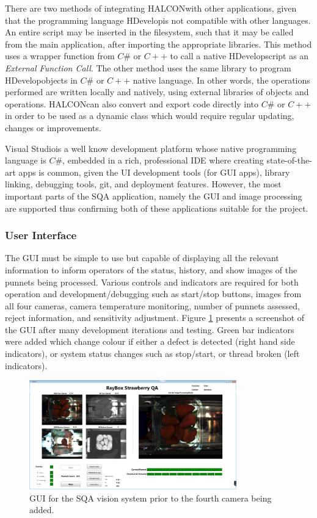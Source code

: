 \documentclass[fleqn,twoside,12pt]{report}
\begin{document}
There are two methods of integrating HALCON\texttrademark with other applications, given that the programming language HDevelop\texttrademark is not compatible with other languages. An entire script may be inserted in the filesystem, such that it may be called from the main application, after importing the appropriate libraries. This method uses a wrapper function from $C\#$ or $C++$ to call a native HDevelop\texttrademark script as an \textit{External Function Call}. The other method uses the same library to program HDevelop\texttrademark objects in $C\#$ or $C++$ native language. In other words, the operations performed are written locally and natively, using external libraries of objects and operations. HALCON\texttrademark can also convert and export code directly into $C\#$ or $C++$ in order to be used as a dynamic class which would require regular updating, changes or improvements.

Visual Studio\textregistered is a well know development platform whose native programming language is $C\#$, embedded in a rich, professional IDE where creating state-of-the-art apps is common, given the UI development tools (for GUI apps), library linking, debugging tools, git, and deployment features. However, the most important parts of the SQA application, namely the GUI and image processing are supported thus confirming both of these applications suitable for the project.


\subsubsection{User Interface}

The GUI must be simple to use but capable of displaying all the relevant information to inform operators of the status, history, and show images of the punnets being processed. Various controls and indicators are required for both operation and development/debugging such as start/stop buttons, images from all four cameras, camera temperature monitoring, number of punnets assessed, reject information, and sensitivity adjustment. Figure \ref{fig:GUI} presents a screenshot of the GUI after many development iterations and testing. Green bar indicators were added which change colour if either a defect is detected (right hand side indicators), or system status changes such as stop/start, or thread broken (left indicators).  


\begin{figure}[h]
	\centering
	\includegraphics[width=0.8\textwidth]{GUI.png}
	\caption{GUI for the SQA vision system prior to the fourth camera being added.}
	\label{fig:GUI}
\end{figure}
  
\end{document}
